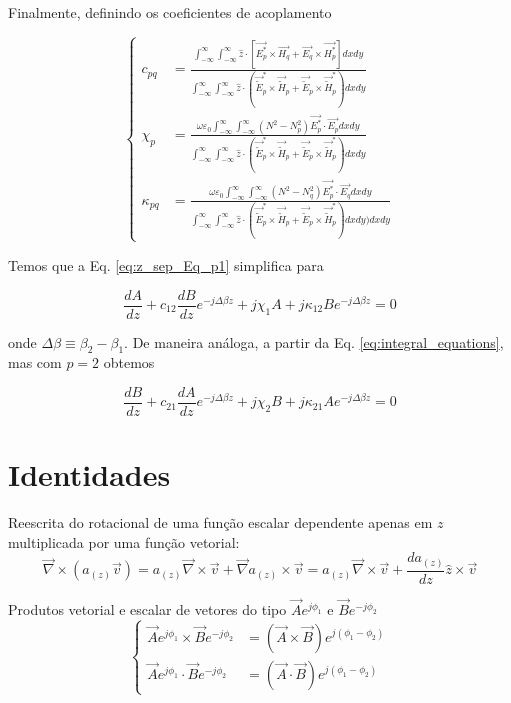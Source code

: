 \documentclass[11pt]{article} %
\newcommand{\diverg}{\vec{\nabla}}
\newcommand{\tildee}{ \vec{\tilde{E}}}
\newcommand{\tildeh}{ \vec{\tilde{H}}}
\newcommand{\epsz}{\varepsilon_0}
\newcommand{\couplingdenom}{ \int_{-\infty}^\infty \int_{-\infty}^\infty \hat{z}\cdot\left(\tildee_p^*\times\tildeh_p+\tildee_p\times\tildeh_p^*\right) dxdy }
\begin{document}
Finalmente, definindo os coeficientes de acoplamento

\begin{equation}
\label{eq:coupling_coeff}
\left\{
\begin{split}
c_{pq} &= \frac{\int_{-\infty}^\infty\int_{-\infty}^\infty \hat{z} \cdot \left[ \vec{E_p^*}\times\vec{H_q} + \vec{E_q}\times\vec{H_p^*} \right] dxdy}{\couplingdenom} \\
\chi_{p} &= \frac{\omega\epsz\int_{-\infty}^\infty\int_{-\infty}^\infty \left(N^2-N_p^2\right) \vec{E_p^*}\cdot\vec{E_p} dxdy}{\couplingdenom} \\
\kappa_{pq} &= \frac{\omega\epsz\int_{-\infty}^\infty\int_{-\infty}^\infty \left(N^2-N_q^2\right) \vec{E_p^*}\cdot\vec{E_q} dxdy}{\couplingdenom) dxdy}
\end{split}
\right.
\end{equation}

Temos que a Eq. \ref{eq:z_sep_Eq_p1} simplifica para

\begin{equation}
\frac{dA}{dz} + c_{12}\frac{dB}{dz}e^{-j\Delta\beta z} + j\chi_1A + j\kappa_{12}Be^{-j\Delta\beta z} = 0
\end{equation}

onde $\Delta\beta\equiv\beta_2-\beta_1$. De maneira análoga, a partir da Eq. \ref{eq:integral_equations}, mas com $p=2$ obtemos

\begin{equation}
\frac{dB}{dz} + c_{21}\frac{dA}{dz}e^{-j\Delta\beta z} + j\chi_2B + j\kappa_{21}Ae^{-j\Delta\beta z} = 0
\end{equation}

\section{Identidades}


Reescrita do rotacional de uma função escalar dependente apenas em $z$ multiplicada por uma função vetorial:
\begin{equation}\label{eq:rot_av}
\diverg\times\left(a_{(z)}\vec{v}\right) = a_{(z)}\diverg\times\vec{v} + \diverg a_{(z)}\times\vec{v} = a_{(z)}\diverg\times\vec{v} + \frac{da_{(z)}}{dz}\hat{z}\times\vec{v}
\end{equation}

Produtos vetorial e escalar de vetores do tipo $\vec{A}e^{j\phi_1}$ e $\vec{B}e^{-j\phi_2}$
\begin{equation} \label{eq:cross_dot_identity}
\left\{
\begin{split}
\vec{A}e^{j\phi_1}\times \vec{B}e^{-j\phi_2} &= (\vec{A}\times\vec{B})e^{j(\phi_1-\phi_2)} \\
\vec{A}e^{j\phi_1}\cdot \vec{B}e^{-j\phi_2} &= (\vec{A}\cdot\vec{B})e^{j(\phi_1-\phi_2)}
\end{split}
\right.
\end{equation}
\end{document}

